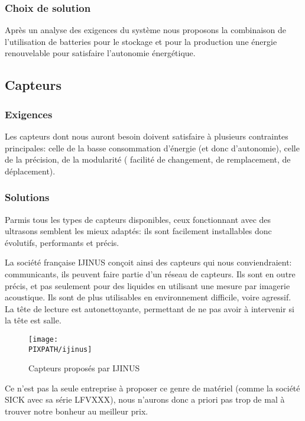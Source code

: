 \subsubsection{Choix de solution}
Après un analyse des exigences du système nous proposons la combinaison de l'utilisation de batteries pour le stockage et pour la production une énergie renouvelable pour satisfaire l'autonomie énergétique.

\subsection{Capteurs}

    \subsubsection{Exigences}
    Les capteurs dont nous auront besoin doivent satisfaire à plusieurs
    contraintes principales: celle de la basse consommation d'énergie
    (et donc d'autonomie), celle de la précision, de la modularité (
    facilité de changement, de remplacement, de déplacement).

    \subsubsection{Solutions}
    Parmis tous les types de capteurs disponibles, ceux fonctionnant avec des
    ultrasons semblent les mieux adaptés: ils sont facilement installables donc
    évolutifs, performants et précis.

    La société française IJINUS conçoit ainsi des capteurs qui nous
    conviendraient: communicants, ils peuvent faire partie d'un
    réseau de capteurs. Ils sont en outre précis, et pas seulement
    pour des liquides en utilisant une mesure par imagerie acoustique.
    Ils sont de plus utilisables en environnement difficile, voire agressif.
    La tête de lecture est autonettoyante, permettant de ne pas avoir
    à intervenir si la tête est salle.

    \begin{figure}[!h]
    \begin{center}
    \texttt{[image: \\PIXPATH/ijinus]}
    \caption{Capteurs proposés par IJINUS}
    \end{center}
    \end{figure}

    Ce n'est pas la seule entreprise à proposer ce genre de matériel (comme la société SICK avec sa série LFVXXX), nous
    n'aurons donc a priori pas trop de mal à trouver notre bonheur au meilleur
    prix.

